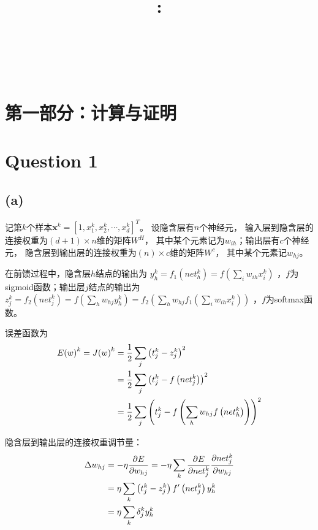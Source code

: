 \documentclass{article}
\title{
    \vspace{2in}
    \textmd{\textbf{\courseName}:\homeworkTitle}\\
    \vspace{0.1in}
    \large{\studentId}\\
    \large{\studentName}\\
    \vspace{3in}
}
\newcommand{\question}[1]{\section*{Question #1}}
\renewcommand{\part}[1]{\subsection*{(#1)}}
\begin{document}
\maketitle
\date{}
\pagebreak

\section*{第一部分：计算与证明}

\question{1}
\part{a}
记第$k$个样本${\pmb{x}^k} = {\left[ {1,x_1^k,x_2^k, \cdots ,x_d^k} \right]^T}$。
设隐含层有$n$个神经元，
输入层到隐含层的连接权重为$\left( {d + 1} \right) \times n$维的矩阵${W^H}$，
其中某个元素记为${w_{ih}}$；输出层有$c$个神经元，
隐含层到输出层的连接权重为$\left( n \right) \times c$维的矩阵${W^c}$，
其中某个元素记${w_{hj}}$。

在前馈过程中，隐含层$h$结点的输出为
$y_h^k = {f_1}\left( {net_h^k} \right) = f\left( {\sum\limits_i {{w_{ih}}x_i^k} } \right)$
，$f$为sigmoid函数；输出层$j$结点的输出为
$z_j^k = {f_2}\left( {net_j^k} \right) = f\left( {\sum\limits_h {{w_{hj}}y_h^k} } \right) = {f_2}\left( {\sum\limits_h {{w_{hj}}{f_1}\left( {\sum\limits_i {{w_{ih}}x_i^k} } \right)} } \right)$
，$f$为softmax函数。

误差函数为
\begin{align*}
	E{\left( w \right)^k} = J{\left( w \right)^k} 
	&= {1 \over 2}\sum\limits_j {{{\left( {t_j^k - z_j^k} \right)}^2}} \\
	&= {1 \over 2}\sum\limits_j {{{\left( {t_j^k - f\left( {net_j^k} \right)} \right)}^2}} \\
	&= {1 \over 2}\sum\limits_j {{{\left( {t_j^k - f\left( {\sum\limits_h {{w_{hj}}f\left( {net_h^k} \right)} } \right)} \right)}^2}} 
\end{align*}

隐含层到输出层的连接权重调节量：
\begin{align*}
	\Delta {w_{hj}} 
	&=  - \eta {{\partial E} \over {\partial {w_{hj}}}} 
	= - \eta \sum\limits_k {{{\partial E} \over {\partial net_j^k}}{{\partial net_j^k} \over {\partial {w_{hj}}}}}\\
	&= \eta \sum\limits_k {\left( {t_j^k - z_j^k} \right)f'\left( {net_j^k} \right)y_h^k} \\
	&= \eta \sum\limits_k {\delta _j^ky_h^k} 
\end{align*}
\end{document}
